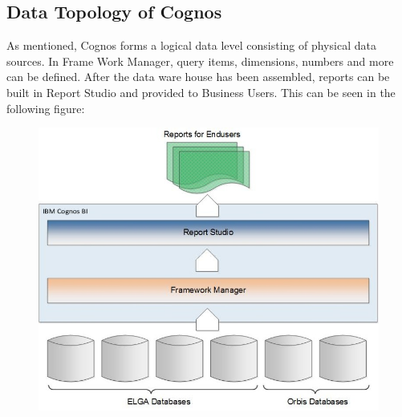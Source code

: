 \documentclass[a4paper]{article}
\begin{document}
	\subsection{Data Topology of Cognos}
	As mentioned, Cognos forms a logical data level consisting of
	physical data sources. In Frame Work Manager, query items, dimensions, numbers
	and more can be defined. After the data ware house has been assembled, reports
	can be built in Report Studio and provided to Business Users. This can be seen
	in the following figure:
	\begin{figure}[!ht]
		  \centering
		      \includegraphics[width=1.0\textwidth]{ALLDBtoCognos}
		  \caption{}
	\end{figure}
	
	\newpage
		
\end{document}
